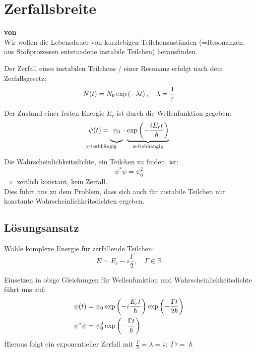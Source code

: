 \documentclass[Ex4_Zusammenfassung.tex]{subfiles}
\begin{document}
\section{Zerfallsbreite}
\textbf{von \fabs}\\

Wir wollen die Lebensdauer von kurzlebigen Teilchenzuständen (=Resonanzen: aus Stoßprozessen entstandene instabile Teilchen) herausfinden.

Der Zerfall eines instabilen Teilchens / einer Resonanz erfolgt nach dem Zerfallsgesetz:
\begin{equation}
	N(t) = N_0 \exp \left( - \lambda t \right), \quad \lambda = \frac{1}{\tau}
\end{equation}

Der Zustand einer festen Energie $E_r$ ist durch die Wellenfunktion gegeben:
\begin{equation}
	\psi(t) = \underbrace{ \vphantom{\lp - \frac{i E_r t}{\hslash} \rp} \psi_0}_{\mathllap{\text{ortsabhängig}}} \cdot \underbrace{\exp \lp - \frac{i E_r t}{\hslash} \rp}_{\mathclap{\text{zeitabhängig}}}
\end{equation}

Die Wahrscheinlichkeitsdichte, ein Teilchen zu finden, ist:
\begin{equation}
	\psi^* \psi = \psi_0^2
\end{equation}
$\Rightarrow$ zeitlich konstant, kein Zerfall.\\
Dies führt uns zu dem Problem, dass sich auch für instabile Teilchen nur konstante Wahrscheinlichkeitsdichten ergeben.

\subsection{Lösungsansatz}
Wähle komplexe Energie für zerfallende Teilchen:
\begin{equation}
	E = E_r - i \frac{\Gamma}{2}, \quad \Gamma \in \mathbb{R}
\end{equation}

Einsetzen in obige Gleichungen für Wellenfunktion und Wahrscheinlichkeitsdichte führt uns auf:
\begin{align}
	\psi(t) &= \psi_0 \exp \left( -i \frac{E_r t}{\hslash}\right) \exp \left( -\frac{\Gamma t}{2 \hslash} \right)\\
	\psi^* \psi &= \psi_0^2 \exp \left( -\frac{\Gamma t}{\hslash}  \right)
\end{align}
Hieraus folgt ein exponentieller Zerfall mit $\frac{\Gamma}{\hslash} = \lambda = \frac{1}{\tau};\ \Gamma \tau = \hslash$\\
\end{document}
